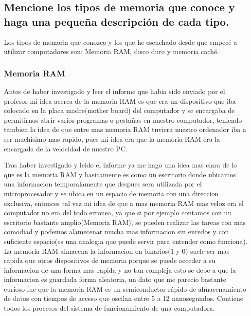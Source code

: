 \documentclass{article}
\begin{document}
\subsection{Mencione los tipos de memoria que conoce y haga una pequeña descripción de cada tipo.}
Los tipos de memoria que conozco y los que he escuchado desde que empecé a utilizar computadores son: Memoria RAM, disco duro y memoria caché.
\subsubsection{Memoria RAM}
Antes de haber investigado y leer el informe que habia sido enviado por el profesor mi idea acerca de la memoria RAM es que era un dispositivo que iba colocado en la placa madre(mother board) del computador y se encargaba de permitirnos abrir varios programas o pestañas en nuestro computador, teniendo tambien la idea de que entre mas memoria RAM tuviera nuestro ordenador iba a ser muchisimo mas rapido, pues mi idea era que la memoria RAM era la encargada de la velocidad de nuestro PC.

\vspace{0.5cm}
Tras haber investigado y leido el informe ya me hago una idea mas clara de lo que es la memoria RAM y basicamente es como un escritorio donde ubicamos una informacion temporalamente que despues sera utilizada por el microprocesador y se ubica en un espacio de memoria con una direccion exclusiva, entonces tal vez mi idea de que a mas memoria RAM mas veloz era el computador no era del todo erronea, ya que si por ejemplo contamos con un escritorio bastante amplio(Memoria RAM), se pueden realizar las tareas con mas comodiad y podemos alamecenar mucha mas informacion sin enredos y con suficiente espacio(es una analogia que puede servir para entender como funciona). La memoria RAM almacena la informacion en binarios(1 y 0) suele ser mas rapida que otros dispositivos de memoria porque se puede acceder a su informacion de una forma mas rapida y no tan compleja esto se debe a que la informacion es guardada forma aleatoria, un dato que me parecio bastante curioso fue que la memoria RAM es un semiconductor rápido de almacenamiento de datos con tiempos de acceso que oscilan entre 5 a 12 nanosegundos. Contiene todos los procesos del sistema de funcionamiento de una computadora. \cite{geniolandia}
\end{document}
